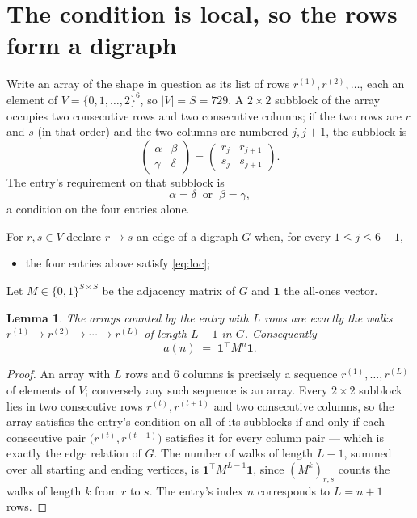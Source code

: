 \documentclass[11pt,a4paper]{article}
\theoremstyle{plain}
\newtheorem{lemma}[theorem]{Lemma}
\theoremstyle{definition}
\begin{document}
\section{The condition is local, so the rows form a digraph}

Write an array of the shape in question as its list of rows
$r^{(1)},r^{(2)},\dots$, each an element of
$V=\{0,1,\dots,2\}^{6}$, so $|V|=S=729$. A $2\times2$ subblock of the array
occupies two consecutive rows and two consecutive columns; if the two rows are $r$
and $s$ (in that order) and the two columns are numbered $j,j+1$,
the subblock is
\[
\begin{pmatrix}\alpha&\beta\\\gamma&\delta\end{pmatrix}=\begin{pmatrix}r_j&r_{j+1}\\s_j&s_{j+1}\end{pmatrix}.
\]
The entry's requirement on that subblock is
\begin{equation}\label{eq:loc}
\alpha=\delta\ \text{ or }\ \beta=\gamma,
\end{equation}
a condition on the four entries alone.

For $r,s\in V$ declare $r\to s$ an edge of a digraph $G$ when, for every
$1\le j\le 6-1$,
\begin{itemize}
\item the four entries above satisfy \eqref{eq:loc};

\end{itemize}
Let $M\in\{0,1\}^{S\times S}$ be the adjacency matrix of $G$ and $\mathbf{1}$ the
all-ones vector.

\begin{lemma}\label{lem:walk}
The arrays counted by the entry with $L$ rows are exactly the walks
$r^{(1)}\to r^{(2)}\to\cdots\to r^{(L)}$ of length $L-1$ in $G$. Consequently
\[
a(n)\;=\;\mathbf{1}^{\!\top}M^{n}\mathbf{1} .
\]
\end{lemma}

\begin{proof}
An array with $L$ rows and $6$ columns is precisely a sequence
$r^{(1)},\dots,r^{(L)}$ of elements of $V$; conversely any such sequence is an array.
Every $2\times2$ subblock lies in two consecutive rows $r^{(t)},r^{(t+1)}$ and two
consecutive columns, so the array satisfies the entry's condition on all of its subblocks
if and only if each consecutive pair $\bigl(r^{(t)},r^{(t+1)}\bigr)$ satisfies it for
every column pair --- which is exactly the edge relation of $G$. The number of walks of
length $L-1$, summed over all starting and ending vertices, is
$\mathbf{1}^{\!\top}M^{L-1}\mathbf{1}$, since $(M^{k})_{r,s}$ counts the walks of
length $k$ from $r$ to $s$. The entry's index $n$ corresponds to $L=n+1$ rows.
\end{proof}
\end{document}
